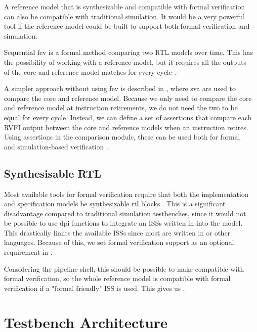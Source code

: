A reference model that is synthesizable and compatible with formal verification can also be compatible with traditional simulation. It would be a very powerful tool if the reference model could be built to support both formal verification and simulation.

Sequential \acrfull{fev} is a formal method comparing two RTL models over time. This has the possibility of working with a reference model, but it requires all the outputs of the core and reference model matches for every cycle \cite{seligmanFormalVerificationEssential2015}.

A simpler approach without using \acrfull{fev} is described in , where  \acrfull{sva} are used to compare the core and reference model. Because we only need to compare the core and reference model at instruction retirements, we do not need the two to be equal for every cycle. Instead, we can define a set of assertions that compare each RVFI output between the core and reference models when an instruction retires. Using assertions in the comparison module, these can be used both for formal and simulation-based verification \cite{seligmanFormalVerificationEssential2015}.

\subsection{Synthesisable RTL}

Most available tools for formal verification require that both the implementation and specification models be synthesizable \acrshort{rtl} blocks \cite{seligmanFormalVerificationEssential2015}. This is a significant disadvantage compared to traditional simulation testbenches, since it would not be possible to use \acrshort{dpi} functions to integrate an ISSs written in \cpp into the model. This drastically limits the available ISSs since most are written in \cpp or other languages. Because of this, we set formal verification support as an optional requirement in \textbf{}.

Considering the pipeline shell, this should be possible to make compatible with formal verification, so the whole reference model is compatible with formal verification if a "formal friendly" ISS is used. This gives us \textbf{}.


\section{Testbench Architecture}
\label{sec:testbench}



